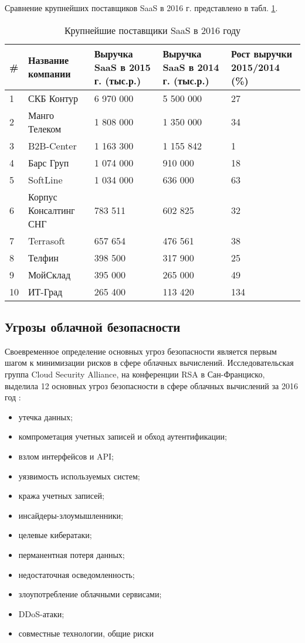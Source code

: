 Сравнение крупнейших поставщиков SaaS в 2016 г. \cite{cnews} представлено в табл. \ref{saas-table}.
\begin{table}[H]
  \caption{Крупнейшие поставщики SaaS в 2016 году}\label{saas-table}
  \begin{tabular}{|p{0.5cm}|p{3.5cm}|p{3.5cm}|p{3.5cm}|p{3.5cm}|}
  \hline \# & Название компании & Выручка SaaS в 2015 г. (тыс.р.) & Выручка SaaS в 2014 г. (тыс.р.) & Рост выручки 2015/2014 (\%) \\
  \hline 1 & СКБ Контур & 6 970 000 & 5 500 000 & 27 \\
  \hline 2 & Манго Телеком & 1 808 000 & 1 350 000 & 34 \\
  \hline 3 & B2B-Center & 1 163 300 & 1 155 842 & 1 \\
  \hline 4 & Барс Груп & 1 074 000 & 910 000 & 18 \\
  \hline 5 & SoftLine & 1 034 000 & 636 000 & 63 \\
  \hline 6 & Корпус Консалтинг СНГ & 783 511 & 602 825 & 32 \\
  \hline 7 & Terrasoft & 657 654 & 476 561 & 38 \\
  \hline 8 & Телфин & 398 500 & 317 900 & 25 \\
  \hline 9 & МойСклад & 395 000 & 265 000 & 49 \\
  \hline 10 & ИТ-Град & 265 400 & 113 420 & 134 \\
  \hline
  \end{tabular}
\end{table}

\subsection{Угрозы облачной безопасности}

Своевременное определение основных угроз безопасности является первым шагом к минимизации рисков в сфере облачных вычислений.
Исследовательская группа Cloud Security Alliance, на конференции RSA в Сан-Франциско, выделила 12 основных угроз безопасности в сфере облачных вычислений за 2016 год \cite{csa}:
\begin{itemize}
  \item утечка данных;
  \item компрометация учетных записей и обход аутентификации;
  \item взлом интерфейсов и API;
  \item уязвимость используемых систем;
  \item кража учетных записей;
  \item инсайдеры-злоумышленники;
  \item целевые кибератаки;
  \item перманентная потеря данных;
  \item недостаточная осведомленность;
  \item злоупотребление облачными сервисами;
  \item DDoS-атаки;
  \item совместные технологии, общие риски
\end{itemize}

